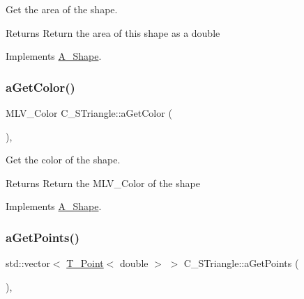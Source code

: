 Get the area of the shape. 

\begin{DoxyReturn}{Returns}
Return the area of this shape as a double 
\end{DoxyReturn}


Implements \hyperlink{classA__Shape_a1b142ee2d873d6c217f65de1632e7b6e}{A\+\_\+\+Shape}.

\mbox{\label{classC__STriangle_a1a0c315653ece65118705648d09336dd}} 
\subsubsection{\texorpdfstring{a\+Get\+Color()}{aGetColor()}}
{\footnotesize\ttfamily M\+L\+V\+\_\+\+Color C\+\_\+\+S\+Triangle\+::a\+Get\+Color (\begin{DoxyParamCaption}{ }\end{DoxyParamCaption})\hspace{0.3cm}{\ttfamily [override]}, {\ttfamily [virtual]}}



Get the color of the shape. 

\begin{DoxyReturn}{Returns}
Return the M\+L\+V\+\_\+\+Color of the shape 
\end{DoxyReturn}


Implements \hyperlink{classA__Shape_a1e90c8132d33e4ac84d42f72606193b2}{A\+\_\+\+Shape}.

\mbox{\label{classC__STriangle_a8d144f4451fe2e5bf6f333d8c37f0f57}} 
\subsubsection{\texorpdfstring{a\+Get\+Points()}{aGetPoints()}}
{\footnotesize\ttfamily std\+::vector$<$ \hyperlink{classT__Point}{T\+\_\+\+Point}$<$ double $>$ $>$ C\+\_\+\+S\+Triangle\+::a\+Get\+Points (\begin{DoxyParamCaption}{ }\end{DoxyParamCaption})\hspace{0.3cm}{\ttfamily [override]}, {\ttfamily [virtual]}}



